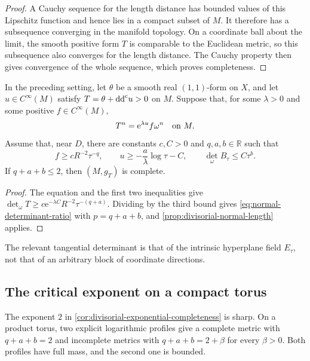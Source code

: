 \begin{proof}
A Cauchy sequence for the length distance has bounded values of this Lipschitz function and hence lies in a compact subset of $M$. It therefore has a subsequence converging in the manifold topology. On a coordinate ball about the limit, the smooth positive form $T$ is comparable to the Euclidean metric, so this subsequence also converges for the length distance. The Cauchy property then gives convergence of the whole sequence, which proves completeness.
\end{proof}

\begin{corollary}\label{cor:divisorial-exponential-completeness}
In the preceding setting, let $\theta$ be a smooth real $(1,1)$-form on $X$, and let $u\in C^\infty(M)$ satisfy $T=\theta+\mathrm{dd}^{\mathrm{c}} u>0$ on $M$. Suppose that, for some $\lambda>0$ and some positive $f\in C^\infty(M)$,
\[
 T^n=\mathrm{e}^{\lambda u}f\omega^n\quad\hbox{on }M.
\]
Assume that, near $D$, there are constants $c,C>0$ and $q,a,b\in\mathbb R$ such that
\begin{equation}\label{eq:divisorial-three-bounds}
 f\geq cR^{-2}\tau^{-q},\qquad
 u\geq-\frac{a}{\lambda}\log\tau-C,\qquad
 \det_\omega B_\tau\leq C\tau^b.
\end{equation}
If $q+a+b\leq2$, then $(M,g_T)$ is complete.
\end{corollary}

\begin{proof}
The equation and the first two inequalities give
$\det_\omega T\geq c\mathrm{e}^{-\lambda C}R^{-2}\tau^{-(q+a)}$.
Dividing by the third bound gives \eqref{eq:normal-determinant-ratio} with $p=q+a+b$, and \cref{prop:divisorial-normal-length} applies.
\end{proof}

The relevant tangential determinant is that of the intrinsic hyperplane field $E_\tau$, not that of an arbitrary block of coordinate directions.

\subsection{The critical exponent on a compact torus}

The exponent $2$ in \cref{cor:divisorial-exponential-completeness} is sharp. On a product torus, two explicit logarithmic profiles give a complete metric with $q+a+b=2$ and incomplete metrics with $q+a+b=2+\beta$ for every $\beta>0$. Both profiles have full mass, and the second one is bounded.

